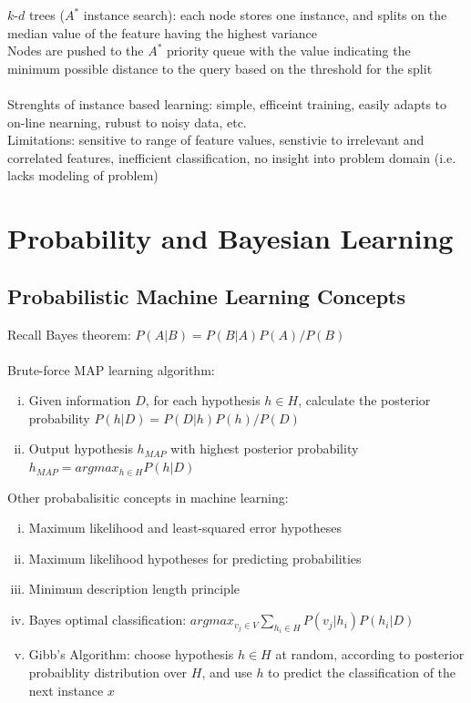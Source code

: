 \documentclass{article}
\begin{document}
		$k$-$d$ trees ($A^*$ instance search): each node stores one instance, and splits on the median value of the feature having the highest variance \\
		Nodes are pushed to the $A^*$ priority queue with the value indicating the minimum possible distance to the query based on the threshold for the split \\
		\\
		Strenghts of instance based learning: simple, efficeint training, easily adapts to on-line nearning, rubust to noisy data, etc. \\
		Limitations: sensitive to range of feature values, senstivie to irrelevant and correlated features, inefficient classification, no insight into problem domain (i.e. lacks modeling of problem)
		\clearpage

	\section{Probability and Bayesian Learning}
		\subsection{Probabilistic Machine Learning Concepts}
			Recall Bayes theorem: $P(A|B) = P(B|A)P(A)/P(B)$ \\
			\\
			Brute-force MAP learning algorithm:
			\begin{enumerate}[(i)]
				\item Given information $D$, for each hypothesis $h \in H$, calculate the posterior probability $P(h|D) = P(D|h)P(h)/P(D)$
				\item Output hypothesis $h_{MAP}$ with highest posterior probability $h_{MAP} = argmax_{h \in H} P(h|D)$
				\end{enumerate}
			Other probabalisitic concepts in machine learning:
			\begin{enumerate}[(i)]
				\item Maximum likelihood and least-squared error hypotheses
				\item Maximum likelihood hypotheses for predicting probabilities
				\item Minimum description length principle
				\item Bayes optimal classification: $argmax_{v_j \in V}\sum_{h_i \in H} P(v_j|h_i)P(h_i|D)$
				\item Gibb's Algorithm: choose hypothesis $h \in H$ at random, according to posterior probaiblity distribution over $H$, and use $h$ to predict the classification of the next instance $x$ 
				\end{enumerate}
\end{document}
